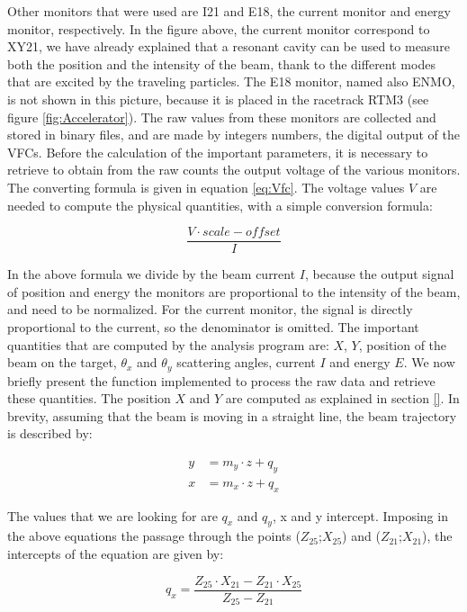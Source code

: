 \begin{appendices}
Other monitors that were used are I21 and E18, the current monitor and energy monitor, respectively. In the figure above, the current monitor correspond to XY21, we have already explained that a resonant cavity can be used to measure both the position and the intensity of the beam, thank to the different modes that are excited by the traveling particles. The E18 monitor, named also ENMO, is not shown in this picture, because it is placed in the racetrack RTM3 (see figure \ref{fig:Accelerator}). 
The raw values from these monitors are collected and stored in binary files, and are made by integers numbers, the digital output of the VFCs. Before the calculation of the important parameters, it is necessary to retrieve to obtain from the raw counts the output voltage of the various monitors. The converting formula is given in equation \ref{eq:Vfc}. The voltage values $V$ are needed to compute the physical quantities, with a simple conversion formula:

\begin{equation}
\dfrac{V \cdot scale - offset}{I}
\end{equation}

In the above formula we divide by the beam current $I$, because the output signal of position and energy the monitors are proportional to the intensity of the beam, and need to be normalized. For the current monitor, the signal is directly proportional to the current, so the denominator is omitted.
The important quantities that are computed by the analysis program are: $X$, $Y$, position of the beam on the target, $\theta_{x}$ and $\theta_{y}$ scattering angles, current $I$ and energy $E$. 
We now briefly present the function implemented to process the raw data and retrieve these quantities.
The position $X$ and $Y$ are computed as explained in section \ref{}. In brevity, assuming that the beam is moving in a straight line, the  beam trajectory is described by:

\begin{align*}
y &= m_{y} \cdot z + q_{y} \\
x &= m_{x} \cdot z + q_{x}
\end{align*}

The values that we are looking for are $q_{x}$ and $q_{y}$, x and y intercept. 
Imposing in the above equations the passage through the points ($Z_{25}$;$X_{25}$) and ($Z_{21}$;$X_{21}$), the intercepts of the equation are given by:

\begin{equation}
q_{x} = \dfrac{Z_{25} \cdot X_{21} - Z_{21} \cdot X_{25}}{Z_{25} - Z_{21}}
\end{equation} 


\end{appendices}

